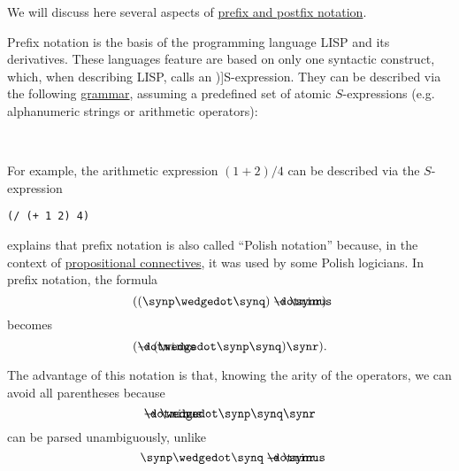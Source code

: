 \begin{remark}\label{rem:def:function_application_syntax}
  We will discuss here several aspects of \hyperref[def:function_application_syntax]{prefix and postfix notation}.

  \begin{thmenum}
     Prefix notation is the basis of the programming language LISP and its derivatives. These languages feature are based on only one syntactic construct, which, when describing LISP,  calls an \term[en=S-expression (\cite[187]{McCarthy1960SExpressionsPartI})]{S-expression}. They can be described via the following \hyperref[def:formal_grammar]{grammar}, assuming a predefined set of atomic \( S \)-expressions (e.g. alphanumeric strings or arithmetic operators):
    \begin{bnf*}
       { \bnfor {} \bnfsp \bnftsq{ } \bnfsp {}} \\
            { \bnfor \bnftsq{(} \bnfsp {} \bnfsp \bnftsq{)}}
    \end{bnf*}

    For example, the arithmetic expression \( (1 + 2) / 4 \) can be described via the \( S \)-expression
    \begin{center}
      \begin{BVerbatim}[gobble=8]
        (/ (+ 1 2) 4)
      \end{BVerbatim}
    \end{center}

      explains that prefix notation is also called \enquote{Polish notation} because, in the context of \hyperref[def:propositional_alphabet/connectives]{propositional connectives}, it was used by some Polish logicians. In prefix notation, the formula
    \begin{equation*}
      ((\synp \synwedge \synq) \synimplies \synr)
    \end{equation*}
    becomes
    \begin{equation*}
      (\synimplies (\synwedge \synp \synq) \synr).
    \end{equation*}

    The advantage of this notation is that, knowing the arity of the operators, we can avoid all parentheses because
    \begin{equation*}
      \synimplies \synwedge \synp \synq \synr
    \end{equation*}
    can be parsed unambiguously, unlike
    \begin{equation*}
      \synp \synwedge \synq \synimplies \synr.
    \end{equation*}


\end{thmenum}
\end{remark}
